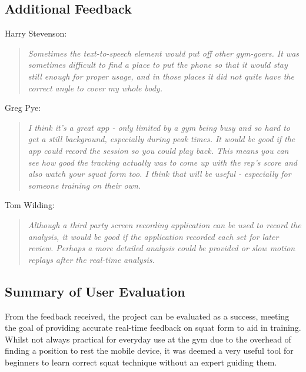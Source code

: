\subsection{Additional Feedback}

Harry Stevenson:
\begin{quote}
\emph{Sometimes the text-to-speech element would put off other gym-goers. It was sometimes difficult to find a place to put the phone so that it would stay still enough for proper usage, and in those places it did not quite have the correct angle to cover my whole body.}
\end{quote}

Greg Pye:
\begin{quote}
\emph{I think it's a great app - only limited by a gym being busy and so hard to get a still background, especially during peak times. It would be good if the app could record the session so you could play back. This means you can see how good the tracking actually was to come up with the rep's score and also watch your squat form too. I think that will be useful - especially for someone training on their own.}
\end{quote}

Tom Wilding:
\begin{quote}
\emph{Although a third party screen recording application can be used to record the analysis, it would be good if the application recorded each set for later review. Perhaps a more detailed analysis could be provided or slow motion replays after the real-time analysis.}
\end{quote}

\subsection{Summary of User Evaluation}

From the feedback received, the project can be evaluated as a success, meeting the goal of providing accurate real-time feedback on squat form to aid in training. Whilst not always practical for everyday use at the gym due to the overhead of finding a position to rest the mobile device, it was deemed a very useful tool for beginners to learn correct squat technique without an expert guiding them.